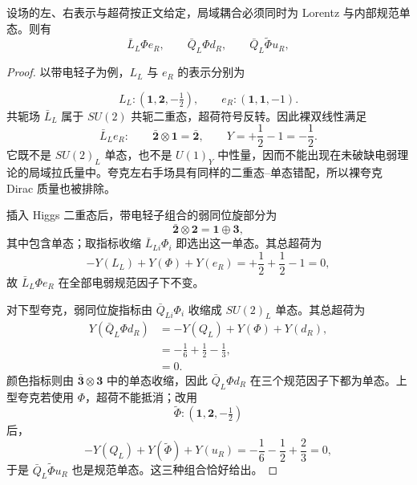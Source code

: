 \begin{proposition}
设场的左、右表示与超荷按正文给定，局域耦合必须同时为 Lorentz 与内部规范单态。则有
\begin{equation}
 {
 \bar L_L\Phi e_R,
 \qquad
 \bar Q_L\Phi d_R,
 \qquad
 \bar Q_L\widetilde\Phi u_R,}
\label{eq:sm-yukawa-invariant-structures-dp43}
\end{equation}
\end{proposition}
\begin{proof}
以带电轻子为例，$L_L$ 与 $e_R$ 的表示分别为

\begin{equation*}
 L_L:(\mathbf1,\mathbf2,-\tfrac12),
 \qquad
 e_R:(\mathbf1,\mathbf1,-1).
\end{equation*}
共轭场 $\bar L_L$ 属于 $SU(2)$ 共轭二重态，超荷符号反转。因此裸双线性满足
\begin{equation*}
 \bar L_L e_R:
 \qquad
 \bar{\mathbf2}\otimes\mathbf1=\bar{\mathbf2},
 \qquad
 Y=+\frac12-1=-\frac12.
\end{equation*}
它既不是 $SU(2)_L$ 单态，也不是 $U(1)_Y$ 中性量，因而不能出现在未破缺电弱理论的局域拉氏量中。夸克左右手场具有同样的二重态--单态错配，所以裸夸克 Dirac 质量也被排除。

插入 Higgs 二重态后，带电轻子组合的弱同位旋部分为
\begin{equation*}
 \bar{\mathbf2}\otimes\mathbf2
 =\mathbf1\oplus\mathbf3,
\end{equation*}
其中包含单态；取指标收缩 $\bar L_{Li}\Phi_i$ 即选出这一单态。其总超荷为
\begin{equation*}
 -Y(L_L)+Y(\Phi)+Y(e_R)
 =+\frac12+\frac12-1=0,
\end{equation*}
故 $\bar L_L\Phi e_R$ 在全部电弱规范因子下不变。

对下型夸克，弱同位旋指标由 $\bar Q_{Li}\Phi_i$ 收缩成 $SU(2)_L$ 单态。其总超荷为
\begin{align*}
 Y(\bar Q_L\Phi d_R)
 &=-Y(Q_L)+Y(\Phi)+Y(d_R),\\
 &=-\frac16+\frac12-\frac13,\\
 &=0.
\end{align*}
颜色指标则由 $\bar{\mathbf3}\otimes\mathbf3$ 中的单态收缩，因此 $\bar Q_L\Phi d_R$ 在三个规范因子下都为单态。上型夸克若使用 $\Phi$，超荷不能抵消；改用
\begin{equation*}
 \widetilde\Phi:(\mathbf1,\mathbf2,-\tfrac12)
\end{equation*}
后，
\begin{equation*}
 -Y(Q_L)+Y(\widetilde\Phi)+Y(u_R)
 =-\frac16-\frac12+\frac23=0,
\end{equation*}
于是 $\bar Q_L\widetilde\Phi u_R$ 也是规范单态。这三种组合恰好给出。
\end{proof}

